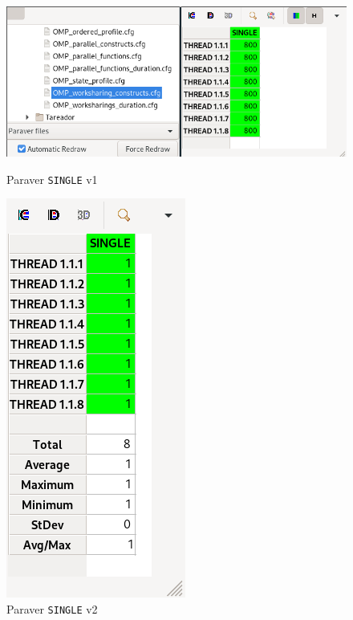 \begin{figure}[H]
    \begin{minipage}{0.5\textwidth}
        \centering
        \includegraphics[scale=0.4]{captures/v1-single.png}
        \caption{Paraver \texttt{SINGLE} v1}
        \label{fig:single_v1} 
    \end{minipage}
    \begin{minipage}{0.5\textwidth}
        \centering
        \includegraphics[scale=0.4]{captures/v2-single.png}
        \caption{Paraver \texttt{SINGLE} v2}
        \label{fig:single_v2} 
    \end{minipage}
\end{figure}


